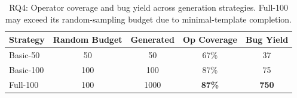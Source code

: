 \begin{table}[t]
\centering
\caption{RQ4: Operator coverage and bug yield across generation strategies. Full-100 may exceed its random-sampling budget due to minimal-template completion.}
\label{tab:rq4-coverage}
\small
\setlength{\tabcolsep}{4pt}
\begin{tabular}{lcccc}
\toprule
\textbf{Strategy} & \textbf{Random Budget} & \textbf{Generated} & \textbf{Op Coverage} & \textbf{Bug Yield} \\
\midrule
Basic-50 & 50 & 50 & 67\% & 37 \\
Basic-100 & 100 & 100 & 87\% & 75 \\
Full-100 & 100 & 1000 & \textbf{87\%} & \textbf{750} \\
\bottomrule
\end{tabular}
\end{table}
